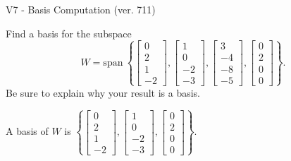\begin{exercise}
  \begin{exerciseTitle}V7 - Basis Computation (ver. 711)\end{exerciseTitle}
  \begin{exerciseStatement}
    Find a basis for the subspace 
\[W=\mathrm{span}\ \left\{\left[\begin{array}{r}
0 \\
2 \\
1 \\
-2
\end{array}\right] , \left[\begin{array}{r}
1 \\
0 \\
-2 \\
-3
\end{array}\right] , \left[\begin{array}{r}
3 \\
-4 \\
-8 \\
-5
\end{array}\right] , \left[\begin{array}{r}
0 \\
2 \\
0 \\
0
\end{array}\right]\right\}.\]
 Be sure to explain why your result is a basis.


  \end{exerciseStatement}
  \begin{exerciseAnswer}
   A basis of \(W\) is  \(\left\{\left[\begin{array}{r}
0 \\
2 \\
1 \\
-2
\end{array}\right] , \left[\begin{array}{r}
1 \\
0 \\
-2 \\
-3
\end{array}\right] , \left[\begin{array}{r}
0 \\
2 \\
0 \\
0
\end{array}\right]\right\}\).
  


  \end{exerciseAnswer}
\end{exercise}